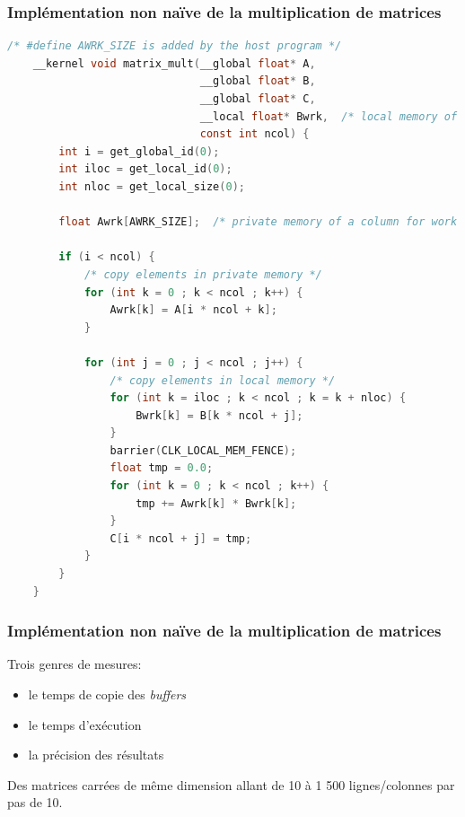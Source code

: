 \begin{frame}[fragile]
    \frametitle{Implémentation non naïve de la multiplication de matrices}
    \begin{lstlisting}[language=c]
    /* #define AWRK_SIZE is added by the host program */
    __kernel void matrix_mult(__global float* A,
                              __global float* B,
                              __global float* C,
                              __local float* Bwrk,  /* local memory of b column for work group */
                              const int ncol) {
        int i = get_global_id(0);
        int iloc = get_local_id(0);
        int nloc = get_local_size(0);

        float Awrk[AWRK_SIZE];  /* private memory of a column for work item */

        if (i < ncol) {
            /* copy elements in private memory */
            for (int k = 0 ; k < ncol ; k++) {
                Awrk[k] = A[i * ncol + k];
            }

            for (int j = 0 ; j < ncol ; j++) {
                /* copy elements in local memory */
                for (int k = iloc ; k < ncol ; k = k + nloc) {
                    Bwrk[k] = B[k * ncol + j];
                }
                barrier(CLK_LOCAL_MEM_FENCE);
                float tmp = 0.0;
                for (int k = 0 ; k < ncol ; k++) {
                    tmp += Awrk[k] * Bwrk[k];
                }
                C[i * ncol + j] = tmp;
            }
        }
    }
    \end{lstlisting}
\end{frame}

\begin{frame}
    \frametitle{Implémentation non naïve de la multiplication de matrices}
    Trois genres de mesures:\pause{}
    \begin{itemize}
        \item le temps de copie des \textit{buffers}\pause{}
        \item le temps d'exécution\pause{}
        \item la précision des résultats\pause{}
    \end{itemize}\pause{}
    \vspace{20pt}
    Des matrices carrées de même dimension allant de 10 à 1 500 lignes/colonnes par pas de 10.
\end{frame}

